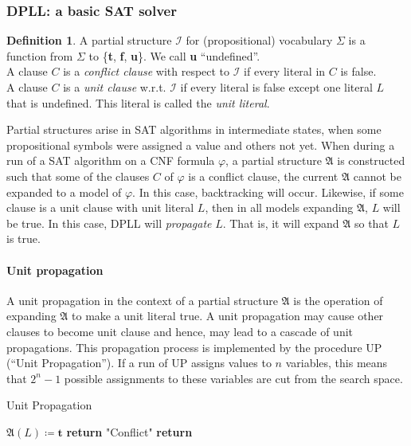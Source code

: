 \documentclass[10pt,a4paper]{article}
\theoremstyle{definition}
\newtheorem{definition}{Definition}[section]
\begin{document}
\subsubsection{DPLL: a basic SAT solver}

\begin{definition}
A partial structure $\mathcal{I}$ for (propositional) vocabulary $\Sigma$ is a function from $\Sigma$ to \{\textbf{t}, \textbf{f}, \textbf{u}\}. We call \textbf{u} “undefined”. \\

A clause $C$ is a \textit{conflict clause} with respect to $\mathcal{I}$ if every literal in $C$ is false.\\

A clause $C$ is a \textit{unit clause} w.r.t. $\mathcal{I}$ if every literal is false except one literal $L$ that is undefined. This literal is called the \textit{unit literal}.
\end{definition}

Partial structures arise in SAT algorithms in intermediate states, when some propositional symbols were assigned a value and others not yet. When during a run of a SAT algorithm on a CNF formula $\varphi$, a partial structure $\mathfrak{A}$ is constructed such that some of the clauses $C$ of $\varphi$ is a conflict clause, the current $\mathfrak{A}$ cannot be expanded to a model of $\varphi$. In this case, backtracking will occur. Likewise, if some clause is a unit clause with unit literal $L$, then in all models expanding $\mathfrak{A}$, $L$ will be true. In this case, DPLL will \textit{propagate} $L$. That is, it will expand $\mathfrak{A}$ so that $L$ is true.

\paragraph{Unit propagation} A unit propagation in the context of a partial structure $\mathfrak{A}$ is the operation of expanding $\mathfrak{A}$ to make a unit literal true. A unit propagation may cause other clauses to become unit clause and hence, may lead to a cascade of unit propagations. This propagation process is implemented by the procedure UP (“Unit Propagation”). If a run of UP assigns values to $n$ variables, this means that $2^n - 1$ possible assignments to these variables are cut from the search space.

\begin{algorithm}
\caption{Unit Propagation}
\begin{algorithmic}[1]
        \State $\mathfrak{A}(L) \coloneqq \textbf{t}$ 
        \State \textbf{return} "Conflict" 
        \EndIf
    \EndWhile
    \State \textbf{return}
\EndProcedure
\end{algorithmic}
\end{algorithm}
\end{document}
